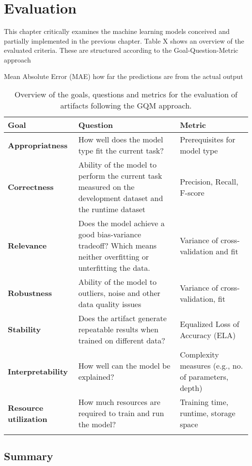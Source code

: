 \chapter{Evaluation}
This chapter critically examines the machine learning models conceived and partially implemented in the previous chapter.
Table X shows an overview of the evaluated criteria. These are structured according to the Goal-Question-Metric approach

Mean Absolute Error (MAE)
how far the predictions are from the actual output


\begin{longtable}{|l|p{6cm}|p{3cm}|}
    \hline
    \textbf{Goal}                 & \textbf{Question}                                                                                               & \textbf{Metric}                                      \\

    \hline
    \textbf{Appropriatness}       & How well does the model type fit the current task?                                                              & Prerequisites for model type                         \\
    \hline
    \textbf{Correctness}          & Ability of the model to perform the current task measured on the development dataset and the runtime dataset    &
    Precision, Recall, F-score                                                                                                                                                                             \\
    \hline
    \textbf{Relevance}            & Does the model achieve a good bias-variance tradeoff? Which means neither overfitting or unterfitting the data. & Variance of cross-validation and fit                 \\
    \hline
    \textbf{Robustness}           & Ability of the model to outliers, noise and other data quality issues                                           & Variance of cross-validation, fit                    \\
    \hline
    \textbf{Stability}            & Does the artifact generate repeatable results when trained on different data?                                   & Equalized Loss of Accuracy (ELA)                     \\
    \hline
    \textbf{Interpretability}     & How well can the model be explained?                                                                            & Complexity measures (e.g., no. of parameters, depth) \\
    \hline
    \textbf{Resource utilization} & How much resources are required to train and run the model?                                                     & Training time, runtime, storage space                \\
    \hline
    \caption{Overview of the goals, questions and metrics for the evaluation of artifacts following the \ac{GQM} approach.}
\end{longtable}




\section{Summary}